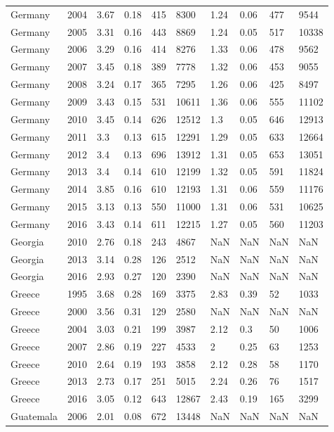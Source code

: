 \begin{tabular}{llllllllll}
Germany & 2004 & 3.67 & 0.18 & 415 & 8300 & 1.24 & 0.06 & 477 & 9544 \\ 
Germany & 2005 & 3.31 & 0.16 & 443 & 8869 & 1.24 & 0.05 & 517 & 10338 \\ 
Germany & 2006 & 3.29 & 0.16 & 414 & 8276 & 1.33 & 0.06 & 478 & 9562 \\ 
Germany & 2007 & 3.45 & 0.18 & 389 & 7778 & 1.32 & 0.06 & 453 & 9055 \\ 
Germany & 2008 & 3.24 & 0.17 & 365 & 7295 & 1.26 & 0.06 & 425 & 8497 \\ 
Germany & 2009 & 3.43 & 0.15 & 531 & 10611 & 1.36 & 0.06 & 555 & 11102 \\ 
Germany & 2010 & 3.45 & 0.14 & 626 & 12512 & 1.3 & 0.05 & 646 & 12913 \\ 
Germany & 2011 & 3.3 & 0.13 & 615 & 12291 & 1.29 & 0.05 & 633 & 12664 \\ 
Germany & 2012 & 3.4 & 0.13 & 696 & 13912 & 1.31 & 0.05 & 653 & 13051 \\ 
Germany & 2013 & 3.4 & 0.14 & 610 & 12199 & 1.32 & 0.05 & 591 & 11824 \\ 
Germany & 2014 & 3.85 & 0.16 & 610 & 12193 & 1.31 & 0.06 & 559 & 11176 \\ 
Germany & 2015 & 3.13 & 0.13 & 550 & 11000 & 1.31 & 0.06 & 531 & 10625 \\ 
Germany & 2016 & 3.43 & 0.14 & 611 & 12215 & 1.27 & 0.05 & 560 & 11203 \\ 
Georgia & 2010 & 2.76 & 0.18 & 243 & 4867 & NaN & NaN & NaN & NaN \\ 
Georgia & 2013 & 3.14 & 0.28 & 126 & 2512 & NaN & NaN & NaN & NaN \\ 
Georgia & 2016 & 2.93 & 0.27 & 120 & 2390 & NaN & NaN & NaN & NaN \\ 
Greece & 1995 & 3.68 & 0.28 & 169 & 3375 & 2.83 & 0.39 & 52 & 1033 \\ 
Greece & 2000 & 3.56 & 0.31 & 129 & 2580 & NaN & NaN & NaN & NaN \\ 
Greece & 2004 & 3.03 & 0.21 & 199 & 3987 & 2.12 & 0.3 & 50 & 1006 \\ 
Greece & 2007 & 2.86 & 0.19 & 227 & 4533 & 2 & 0.25 & 63 & 1253 \\ 
Greece & 2010 & 2.64 & 0.19 & 193 & 3858 & 2.12 & 0.28 & 58 & 1170 \\ 
Greece & 2013 & 2.73 & 0.17 & 251 & 5015 & 2.24 & 0.26 & 76 & 1517 \\ 
Greece & 2016 & 3.05 & 0.12 & 643 & 12867 & 2.43 & 0.19 & 165 & 3299 \\ 
Guatemala & 2006 & 2.01 & 0.08 & 672 & 13448 & NaN & NaN & NaN & NaN \\ 

\end{tabular}
